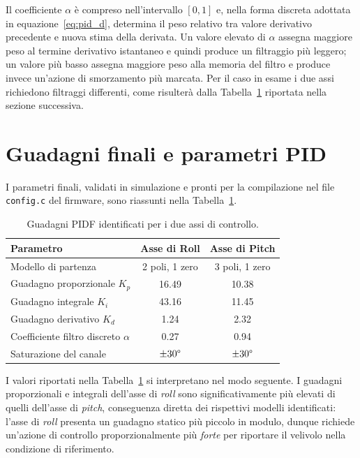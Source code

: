 \documentclass[11pt]{report}
\begin{document}
Il coefficiente $\alpha$ è compreso nell'intervallo $[0,1]$ e, nella forma discreta adottata in equazione~\eqref{eq:pid_d}, determina il peso relativo tra valore derivativo precedente e nuova stima della derivata. Un valore elevato di $\alpha$ assegna maggiore peso al termine derivativo istantaneo e quindi produce un filtraggio più leggero; un valore più basso assegna maggiore peso alla memoria del filtro e produce invece un'azione di smorzamento più marcata. Per il caso in esame i due assi richiedono filtraggi differenti, come risulterà dalla Tabella~\ref{tab:guadagni_pid} riportata nella sezione successiva.

\section{Guadagni finali e parametri PID}
\label{sec:guadagni_finali}

I parametri finali, validati in simulazione e pronti per la compilazione nel file \texttt{config.c} del firmware, sono riassunti nella Tabella~\ref{tab:guadagni_pid}.

\begin{table}[H]
	\centering
	\begin{tabular}{l c c}
		\toprule
		\textbf{Parametro} & \textbf{Asse di Roll} & \textbf{Asse di Pitch} \\
		\midrule
		Modello di partenza & 2 poli, 1 zero & 3 poli, 1 zero \\
		Guadagno proporzionale $K_p$ & 16.49 & 10.38 \\
		Guadagno integrale $K_i$ & 43.16 & 11.45 \\
		Guadagno derivativo $K_d$ & 1.24 & 2.32 \\
		Coefficiente filtro discreto $\alpha$ & 0.27 & 0.94 \\
		Saturazione del canale & $\pm 30\degree$ & $\pm 30\degree$ \\
		\bottomrule
	\end{tabular}
	\caption{Guadagni PIDF identificati per i due assi di controllo.}
	\label{tab:guadagni_pid}
\end{table}

I valori riportati nella Tabella~\ref{tab:guadagni_pid} si interpretano nel modo seguente. I guadagni proporzionali e integrali dell'asse di \textit{roll} sono significativamente più elevati di quelli dell'asse di \textit{pitch}, conseguenza diretta dei rispettivi modelli identificati: l'asse di \textit{roll} presenta un guadagno statico più piccolo in modulo, dunque richiede un'azione di controllo proporzionalmente più \textit{forte} per riportare il velivolo nella condizione di riferimento.
\end{document}
